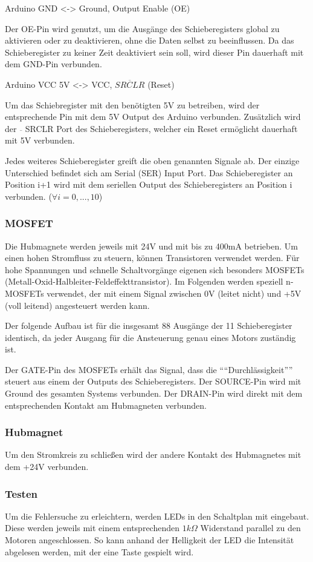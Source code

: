 Arduino GND <-> Ground, Output Enable (OE)

Der OE-Pin wird genutzt, um die Ausgänge des Schieberegisters global zu aktivieren oder zu deaktivieren, ohne die Daten selbst zu beeinflussen.
Da das Schieberegister zu keiner Zeit deaktiviert sein soll, wird dieser Pin dauerhaft mit dem GND-Pin verbunden.

Arduino VCC 5V <-> VCC, $\overline{SRCLR}$ (Reset)

Um das Schiebregister mit den benötigten 5V zu betreiben, wird der entsprechende Pin mit dem 5V Output des Arduino verbunden.
Zusätzlich wird der $\overline{ }$ SRCLR Port des Schieberegisters, welcher ein Reset ermöglicht dauerhaft mit 5V verbunden.

Jedes weiteres Schieberegister greift die oben genannten Signale ab.
Der einzige Unterschied befindet sich am Serial (SER) Input Port.
Das Schieberegister an Position i+1 wird mit dem seriellen Output des Schieberegisters an Position i verbunden. ($\forall i = 0,...,10$)

\subsubsection{MOSFET}

Die Hubmagnete werden jeweils mit 24V und mit bis zu 400mA betrieben.
Um einen hohen Stromfluss zu steuern, können Transistoren verwendet werden.
Für hohe Spannungen und schnelle Schaltvorgänge eigenen sich besonders MOSFETs (Metall-Oxid-Halbleiter-Feldeffekttransistor).
Im Folgenden werden speziell n-MOSFETs verwendet, der mit einem Signal zwischen 0V (leitet nicht) und +5V (voll leitend) angesteuert werden kann.

Der folgende Aufbau ist für die insgesamt 88 Ausgänge der 11 Schieberegister identisch, da jeder Ausgang für die Ansteuerung genau eines Motors zuständig ist.

Der GATE-Pin des MOSFETs erhält das Signal, dass die \enquote{``Durchlässigkeit''} steuert aus einem der Outputs des Schieberegisters.
Der SOURCE-Pin wird mit Ground des gesamten Systems verbunden.
Der DRAIN-Pin wird direkt mit dem entsprechenden Kontakt am Hubmagneten verbunden.

\subsubsection{Hubmagnet}

Um den Stromkreis zu schließen wird der andere Kontakt des Hubmagnetes mit dem +24V verbunden.

\subsubsection{Testen}

Um die Fehlersuche zu erleichtern, werden LEDs in den Schaltplan mit eingebaut.
Diese werden jeweils mit einem entsprechenden $1k\Omega$ Widerstand parallel zu den Motoren angeschlossen.
So kann anhand der Helligkeit der LED die Intensität abgelesen werden, mit der eine Taste gespielt wird.

